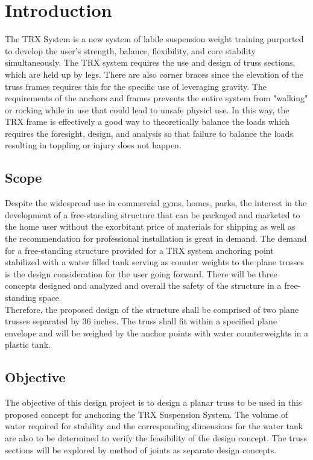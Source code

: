 \chapter{Introduction}
The TRX System is a new system of labile suspension weight training purported to develop the user's strength, balance, flexibility, and core stability simultaneously. The TRX system requires the use and design of truss sections, which are held up by legs. There are also corner braces since the elevation of the truss frames requires this for the specific use of leveraging gravity. The requirements of the anchors and frames prevents the entire system from "walking" or rocking while in use that could lead to unsafe physicl use. In this way, the TRX frame is effectively a good way to theoretically balance the loads which requires the foresight, design, and analysis so that failure to balance the loads resulting in toppling or injury does not happen.
\section{Scope}
Despite the widespread use in commercial gyms, homes, parks, the interest in the development of a free-standing structure that can be packaged and marketed to the home user without the exorbitant price of materials for shipping as well as the recommendation for professional installation is great in demand. The demand for a free-standing structure provided for a TRX system anchoring point stabilized with a water filled tank serving as counter weights to the plane trusses is the design consideration for the user going forward. There will be three concepts designed and analyzed and overall the safety of the structure in a free-standing space.\\
Therefore, the proposed design of the structure shall be comprised of two plane trusses separated by 36 inches. The truss shall fit within a specified plane envelope and will be weighed by the anchor points with water counterweights in a plastic tank.\\ 
\section{Objective}
The objective of this design project is to design a planar truss to be used in this proposed concept for anchoring the TRX Suspension System. The volume of water required for stability and the corresponding dimensions for the water tank are also to be determined to verify the feasibility of the design concept. The truss sections will be explored by method of joints as separate design concepts. \\


